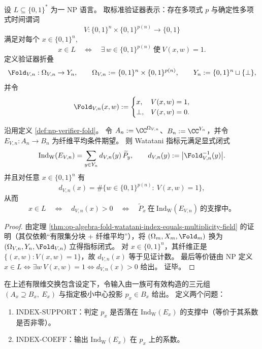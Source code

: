 \begin{definition}[NP 验证器折叠]\label{def:np-verifier-fold}
设 \(L\subseteq\{0,1\}^\ast\) 为一 NP 语言。
取标准验证器表示：存在多项式 \(p\) 与确定性多项式时间谓词
\[
V:\{0,1\}^n\times \{0,1\}^{p(n)}\to\{0,1\}
\]
满足对每个 \(x\in\{0,1\}^n\),
\[
x\in L\quad\Longleftrightarrow\quad \exists\,w\in\{0,1\}^{p(n)}\ \text{使}\ V(x,w)=1.
\]
定义验证器折叠
\[
\Fold_{V,n}:\Omega_{V,n}\to Y_n,
\qquad
\Omega_{V,n}:=\{0,1\}^n\times\{0,1\}^{p(n)},
\qquad
Y_n:=\{0,1\}^n\sqcup\{\bot\},
\]
并令
\[
\Fold_{V,n}(x,w):=
\begin{cases}
x, & V(x,w)=1,\\
\bot, & V(x,w)=0.
\end{cases}
\]
\end{definition}

\begin{theorem}\label{thm:np-watatani-index-support-characterization}
沿用定义 \ref{def:np-verifier-fold}。
令 \(A_n:=\CC^{\Omega_{V,n}}\)、\(B_n:=\CC^{Y_n}\)，并令 \(E_{V,n}:A_n\to B_n\) 为纤维平均条件期望。
则 Watatani 指标元满足显式闭式
\[
\mathrm{Ind}_{\mathrm W}(E_{V,n})
=\sum_{y\in Y_n} d_{V,n}(y)\,\widetilde P_y,
\qquad
d_{V,n}(y):=\bigl|\Fold_{V,n}^{-1}(y)\bigr|.
\]
并且对任意 \(x\in\{0,1\}^n\) 有
\[
d_{V,n}(x)=\#\{w\in\{0,1\}^{p(n)}:\ V(x,w)=1\},
\]
从而
\[
x\in L
\quad\Longleftrightarrow\quad
d_{V,n}(x)>0
\quad\Longleftrightarrow\quad
\widetilde P_x\ \text{在}\ \mathrm{Ind}_{\mathrm W}(E_{V,n})\ \text{的支撑中。}
\]
\end{theorem}
\begin{proof}
由定理 \ref{thm:op-algebra-fold-watatani-index-equals-multiplicity-field} 的证明（其仅依赖“有限集分块 + 纤维平均”），将 \((\Omega_m,X_m,\Fold_m)\) 换为 \((\Omega_{V,n},Y_n,\Fold_{V,n})\) 立得指标闭式。
对 \(x\in\{0,1\}^n\)，其纤维正是 \(\{(x,w):V(x,w)=1\}\)，故 \(d_{V,n}(x)\) 等于见证计数。
最后等价链由 NP 定义 \(x\in L\iff \exists w\ V(x,w)=1\iff d_{V,n}(x)>0\) 给出。
证毕。
\end{proof}

\begin{definition}[指数支撑判别与系数读出]\label{def:index-support-and-coeff-problems}
在上述有限维交换包含设定下，令输入由一族可有效构造的三元组 \((A_x\supseteq B_x,\ E_x)\) 与指定极小中心投影 \(p_x\in B_x\) 给出。
定义两个问题：
\begin{enumerate}
\normalfont
  \item \(\mathrm{INDEX\text{-}SUPPORT}\)：判定 \(p_x\) 是否落在 \(\mathrm{Ind}_{\mathrm W}(E_x)\) 的支撑中（等价于其系数是否非零）。
  \item \(\mathrm{INDEX\text{-}COEFF}\)：输出 \(\mathrm{Ind}_{\mathrm W}(E_x)\) 在 \(p_x\) 上的系数。
\end{enumerate}
\end{definition}

